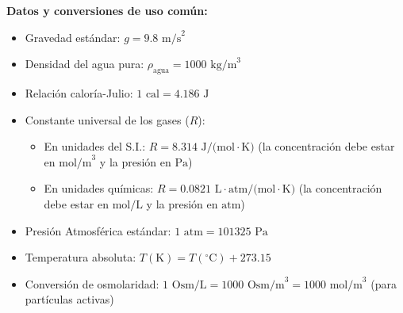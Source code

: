 \documentclass[12pt,letterpaper]{article}
\begin{document}
\noindent \textbf{Datos y conversiones de uso común:}
\begin{itemize}
    \item Gravedad estándar: $g = 9.8 \text{ m/s}^2$
    \item Densidad del agua pura: $\rho_{\text{agua}} = 1000 \text{ kg/m}^3$
    \item Relación caloría-Julio: $1 \text{ cal} = 4.186 \text{ J}$
    \item Constante universal de los gases ($R$):
        \begin{itemize}
            \item En unidades del S.I.: $R = 8.314 \text{ J/(mol}\cdot\text{K)}$ (la concentración debe estar en $\text{mol/m}^3$ y la presión en $\text{Pa}$)
            \item En unidades químicas: $R = 0.0821 \text{ L}\cdot\text{atm/(mol}\cdot\text{K)}$ (la concentración debe estar en $\text{mol/L}$ y la presión en $\text{atm}$)
        \end{itemize}
    \item Presión Atmosférica estándar: $1 \text{ atm} = 101325 \text{ Pa}$
    \item Temperatura absoluta: $T(\text{K}) = T(^{\circ}\text{C}) + 273.15$
    \item Conversión de osmolaridad: $1 \text{ Osm/L} = 1000 \text{ Osm/m}^3 = 1000 \text{ mol/m}^3$ (para partículas activas)
\end{itemize}
\end{document}
